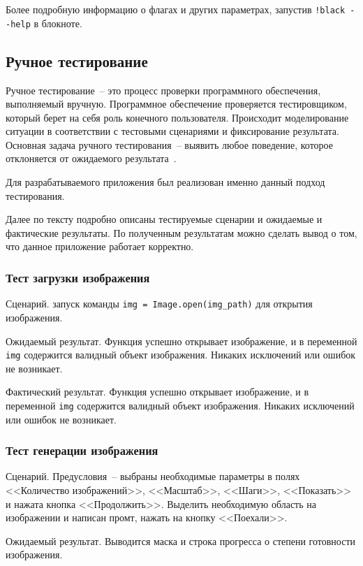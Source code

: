 Более подробную информацию о флагах и других параметрах, запустив \lstinline{!black --help} в блокноте.

\subsection{Ручное тестирование}

Ручное тестирование~-- это процесс проверки программного 
обеспечения, выполняемый вручную. Программное обеспечение проверяется 
тестировщиком, который берет на себя роль конечного пользователя. 
Происходит моделирование ситуации в соответствии с тестовыми сценариями 
и фиксирование результата. Основная задача ручного тестирования~-- выявить 
любое поведение, которое отклоняется от ожидаемого результата~\cite{testing_epam}.

Для разрабатываемого приложения был реализован именно данный 
подход тестирования. 

Далее по тексту подробно описаны тестируемые сценарии и ожидаемые и фактические результаты. По полученным результатам можно сделать вывод о том, что данное приложение работает корректно.

\subsubsection{Тест загрузки изображения}

Сценарий. запуск команды \lstinline{img = Image.open(img_path)} для открытия изображения. 

Ожидаемый результат. Функция успешно открывает изображение, и в переменной \lstinline{img} содержится валидный объект изображения. Никаких исключений или ошибок не возникает.

Фактический результат. Функция успешно открывает изображение, и в переменной \lstinline{img} содержится валидный объект изображения. Никаких исключений или ошибок не возникает.

\subsubsection{Тест генерации изображения}

Сценарий. Предусловия~-- выбраны необходимые параметры в полях <<Количество изображений>>, <<Масштаб>>, <<Шаги>>, <<Показать>> и нажата кнопка <<Продолжить>>. Выделить необходимую область на изображении и написан промт, нажать на кнопку <<Поехали>>.

Ожидаемый результат. Выводится маска и строка прогресса о степени готовности изображения.

